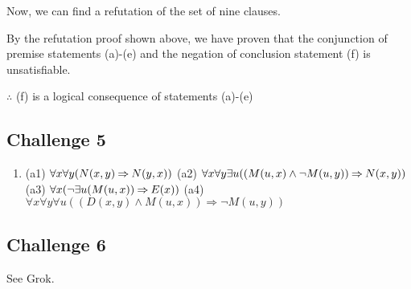 \documentclass[12pt]{article}
\newcommand{\impl}{\mathbin{\Rightarrow}}
\begin{document}
\bigskip
\noindent
Now, we can find a refutation of the set of nine clauses.


\bigskip
\noindent
By the refutation proof shown above, we have proven that the conjunction of
premise statements (a)-(e) and the negation of conclusion statement (f) is
unsatisfiable. 

\bigskip
\noindent
$\therefore$ (f) is a logical consequence of statements (a)-(e)



\subsection*{Challenge 5}

\begin{enumerate}
  \item (a1) $\forall x \forall y(N(x,y) \impl N(y,x))\\\\$
        (a2) $\forall x \forall y \exists u((M(u,x) \land \neg M(u,y)) \impl N(x,y))\\\\$
        (a3) $\forall x(\neg \exists u(M(u,x)) \impl E(x))\\\\$
        (a4) $\forall x \forall y \forall u((D(x,y) \land M(u,x)) \impl \neg M(u,y))$
\end{enumerate}


\subsection*{Challenge 6}
See Grok.
\end{document}
